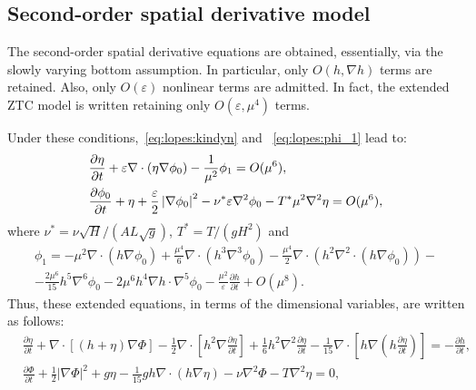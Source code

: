 \subsection{Second-order spatial derivative model}
The  second-order  spatial derivative equations
 are obtained, essentially, via the
slowly varying bottom assumption. In particular, only
$O(h,\nabla h)$ terms are retained.  Also, only $O(\varepsilon)$
nonlinear terms are admitted.  In fact,
the extended ZTC model is written retaining only
$O(\varepsilon,\mu^4)$ terms.

Under these conditions,~\eqref{eq:lopes:kindyn} and
~\eqref{eq:lopes:phi_1} lead to:
\begin{subequations}\label{eq:lopes:kindyn2}
\begin{align}
&\displaystyle\frac{\partial \eta}{\partial t}+\varepsilon\nabla\cdot(\eta\nabla\phi_0)
-\frac{1}{\mu^2}\phi_1=O(\mu^{6}),\vspace{0.3cm}\label{eq:lopes:kindyn2-a}
\\
&\displaystyle\frac{\partial \phi_0}{\partial t}+\eta + \frac{\varepsilon}{2}
\left|\nabla\phi_0\right|^2-\nu^*\varepsilon\nabla^2\phi_0-T^*\mu^2\nabla^2\eta
=O(\mu^{6}),\label{eq:lopes:kindyn2-b}
\end{align}
\end{subequations}
where $\nu^*=\nu\sqrt{H}/(AL\sqrt{g})$, $T^*= T/(gH^2)$ and
\begin{multline}\label{eq:lopes:phi_2}
\phi_1= -\mu^{2}\nabla\cdot\left(h\nabla\phi_0\right)
+\frac{\mu^{4}}{6}\nabla\cdot\left(h^3\nabla^3\phi_0\right)
-\frac{\mu^{4}}{2}\nabla\cdot\left(h^2
\nabla^2\cdot\left(h\nabla\phi_0\right)
\right)-\\ -\frac{2\mu^6}{15}h^5\nabla^6\phi_0-2\mu^6h^4\nabla
h\cdot\nabla^5\phi_0
-\frac{\mu^2}{\varepsilon}\frac{\partial h}{\partial t}+O(\mu^{8}).
\end{multline}
Thus, these extended equations, in terms of the dimensional
variables, are written as follows:
\begin{subequations}\label{eq:lopes:ztc}
\begin{align}
&\frac{\partial\eta}{\partial t}
  +\nabla\cdot[(h+\eta)\nabla{\Phi}] -\frac{1}{2}\nabla\cdot
  [h^{2}\nabla\frac{\partial \eta} {\partial t}]
  +\frac{1}{6}h^{2}\nabla^2\frac{\partial\eta}{\partial t}
  -\frac{1}{15}\nabla\cdot[h\nabla(h\frac{\partial\eta}
    {\partial
      t})]=-\frac{\partial h}{\partial t}, \label{eq:lopes:ztc-a}\\ &\frac{\partial
    \Phi}{\partial t} +\frac{1}{2}|\nabla\Phi|^2+g\eta-
  \frac{1}{15}gh\nabla\cdot(h\nabla\eta)-\nu\nabla^2\Phi-T\nabla^2\eta=0, \label{eq:lopes:ztc-b}
\end{align}
\end{subequations}
